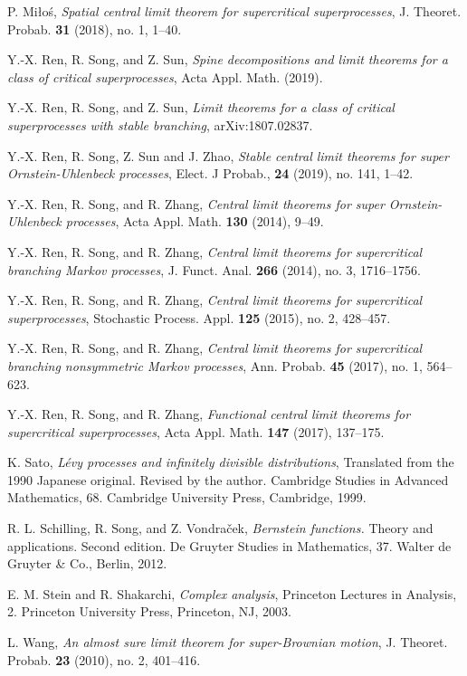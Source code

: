 \documentclass[12pt,a4paper]{amsart}
\theoremstyle{plain}
\theoremstyle{definition}
\numberwithin{equation}{section}
\begin{document}
\begin{thebibliography}{10}
  P. Mi{\l}o{\'s},
  \emph{Spatial central limit theorem for supercritical superprocesses},
  J. Theoret. Probab. \textbf{31} (2018), no. 1, 1--40.

  Y.-X. Ren, R. Song, and Z. Sun,
  \emph{Spine decompositions and limit theorems for a class of critical superprocesses},
  Acta Appl. Math. (2019).

  Y.-X. Ren, R. Song, and Z. Sun,
  \emph{Limit theorems for a class of critical superprocesses with stable branching},
  arXiv:1807.02837.

Y.-X. Ren, R. Song, Z. Sun and J. Zhao,
\emph{Stable central limit theorems for super Ornstein-Uhlenbeck processes},
Elect. J Probab., \textbf{24} (2019), no. 141, 1--42.

  Y.-X. Ren, R. Song, and R. Zhang,
  \emph{Central limit theorems for super {O}rnstein-{U}hlenbeck processes},
  Acta Appl. Math. \textbf{130} (2014), 9--49.

  Y.-X. Ren, R. Song, and R. Zhang,
  \emph{Central limit theorems for supercritical branching {M}arkov processes},
  J. Funct. Anal. \textbf{266} (2014), no. 3, 1716--1756.

  Y.-X. Ren, R. Song, and R. Zhang,
  \emph{Central limit theorems for supercritical superprocesses},
  Stochastic Process. Appl. \textbf{125} (2015), no. 2, 428--457.

  Y.-X. Ren, R. Song, and R. Zhang,
  \emph{Central limit theorems for supercritical branching nonsymmetric {M}arkov processes},
  Ann. Probab. \textbf{45} (2017), no. 1, 564--623.

  Y.-X. Ren, R. Song, and R. Zhang,
  \emph{Functional central limit theorems for supercritical superprocesses},
  Acta Appl. Math. \textbf{147} (2017), 137--175.

  K. Sato,
  \emph{L{\'e}vy processes and infinitely divisible distributions},
  Translated from the 1990 Japanese original. Revised by the author. Cambridge Studies in Advanced Mathematics, 68. Cambridge University Press, Cambridge, 1999.

  R. L. Schilling, R. Song, and Z. Vondra\v{c}ek,
  \emph{Bernstein functions.}
  Theory and applications. Second edition. De Gruyter Studies in Mathematics, 37. Walter de Gruyter \& Co., Berlin, 2012.

  E. M. Stein and R. Shakarchi, \emph{Complex analysis},
  Princeton Lectures in Analysis, 2. Princeton University Press, Princeton, NJ, 2003.

  L. Wang, \emph{An almost sure limit theorem for super-{B}rownian motion},
  J. Theoret. Probab. \textbf{23} (2010), no. 2, 401--416.

\end{thebibliography}
\end{document}
